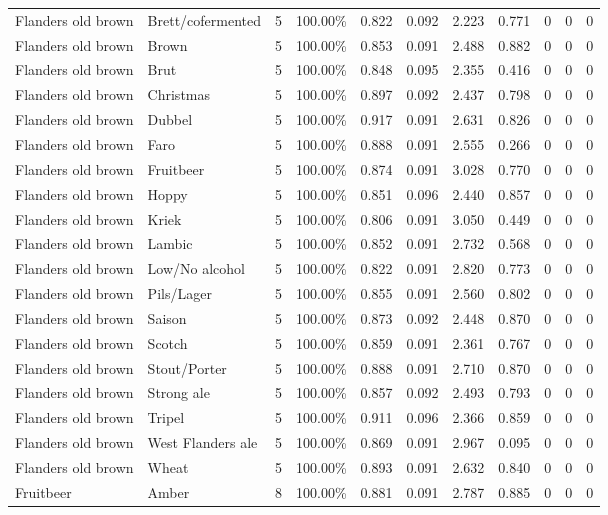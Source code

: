 {\begin{longtable}{llrrrrrrrrr}
Flanders old brown & Brett/cofermented & 5 & 100.00\% & 0.822 & 0.092 & 2.223 & 0.771 & 0 & 0 & 0 \\
Flanders old brown & Brown & 5 & 100.00\% & 0.853 & 0.091 & 2.488 & 0.882 & 0 & 0 & 0 \\
Flanders old brown & Brut & 5 & 100.00\% & 0.848 & 0.095 & 2.355 & 0.416 & 0 & 0 & 0 \\
Flanders old brown & Christmas & 5 & 100.00\% & 0.897 & 0.092 & 2.437 & 0.798 & 0 & 0 & 0 \\
Flanders old brown & Dubbel & 5 & 100.00\% & 0.917 & 0.091 & 2.631 & 0.826 & 0 & 0 & 0 \\
Flanders old brown & Faro & 5 & 100.00\% & 0.888 & 0.091 & 2.555 & 0.266 & 0 & 0 & 0 \\
Flanders old brown & Fruitbeer & 5 & 100.00\% & 0.874 & 0.091 & 3.028 & 0.770 & 0 & 0 & 0 \\
Flanders old brown & Hoppy & 5 & 100.00\% & 0.851 & 0.096 & 2.440 & 0.857 & 0 & 0 & 0 \\
Flanders old brown & Kriek & 5 & 100.00\% & 0.806 & 0.091 & 3.050 & 0.449 & 0 & 0 & 0 \\
Flanders old brown & Lambic & 5 & 100.00\% & 0.852 & 0.091 & 2.732 & 0.568 & 0 & 0 & 0 \\
Flanders old brown & Low/No alcohol & 5 & 100.00\% & 0.822 & 0.091 & 2.820 & 0.773 & 0 & 0 & 0 \\
Flanders old brown & Pils/Lager & 5 & 100.00\% & 0.855 & 0.091 & 2.560 & 0.802 & 0 & 0 & 0 \\
Flanders old brown & Saison & 5 & 100.00\% & 0.873 & 0.092 & 2.448 & 0.870 & 0 & 0 & 0 \\
Flanders old brown & Scotch & 5 & 100.00\% & 0.859 & 0.091 & 2.361 & 0.767 & 0 & 0 & 0 \\
Flanders old brown & Stout/Porter & 5 & 100.00\% & 0.888 & 0.091 & 2.710 & 0.870 & 0 & 0 & 0 \\
Flanders old brown & Strong ale & 5 & 100.00\% & 0.857 & 0.092 & 2.493 & 0.793 & 0 & 0 & 0 \\
Flanders old brown & Tripel & 5 & 100.00\% & 0.911 & 0.096 & 2.366 & 0.859 & 0 & 0 & 0 \\
Flanders old brown & West Flanders ale & 5 & 100.00\% & 0.869 & 0.091 & 2.967 & 0.095 & 0 & 0 & 0 \\
Flanders old brown & Wheat & 5 & 100.00\% & 0.893 & 0.091 & 2.632 & 0.840 & 0 & 0 & 0 \\
Fruitbeer & Amber & 8 & 100.00\% & 0.881 & 0.091 & 2.787 & 0.885 & 0 & 0 & 0 \\

\end{longtable}}
